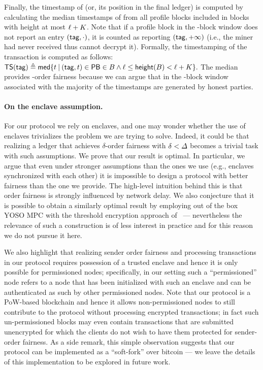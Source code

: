 Finally, the timestamp of \tx (or, its position in the final ledger) is computed by calculating the median timestamps of \txTag from all profile blocks included in blocks with height at most $\ell + K$.
%
Note that if a profile block in the \PBWindowLen-block window does not report an entry $(\mathsf{tag}, \cdot)$, it is counted as reporting $(\mathsf{tag}, +\infty)$ (i.e., the miner had never received \tx thus cannot decrypt it).
%
Formally, the timestamping of the transaction is computed as follows:
%
\( \mathsf{TS}(\mathsf{tag}) \triangleq \mathsf{med} \{ t \mathbin|  (\mathsf{tag}, t) \in \mathsf{PB} \in B \wedge \ell \le \mathsf{height}(B) < \ell + K\}. \)
%
The median provides \delay-order fairness because we can argue that in the \PBWindowLen-block window associated with \txTag the majority of the timestamps are generated by honest parties.

\paragraph{On the enclave assumption.}
%
For our protocol we rely on enclaves, and one may wonder whether the use of enclaves trivializes the problem we are trying to solve.
%
Indeed, it could be that realizing a ledger that achieves $\delta$-order fairness with $\delta < \varDelta$ becomes a trivial task with such assumptions.
%
We prove that our result is optimal.
%
In particular, we argue that even under stronger assumptions than the ones we use (e.g., enclaves synchronized with each other) it is impossible to design a protocol with better fairness than the one we provide.
%
The high-level intuition behind this is that order fairness is strongly influenced by network delay.
%
We also conjecture that it is possible to obtain a similarly optimal result by employing out of the box YOSO MPC \cite{TCC:BGGHKL20} with the threshold encryption approach of~\cite{TOKENOMICS:MalSza23} --- nevertheless the relevance of such a construction is of less interest in practice and for this reason we do not pursue it here.

We also highlight that realizing sender order fairness and processing transactions in our protocol requires possession of a trusted enclave and hence it is only possible for permissioned nodes; specifically, in our setting such a ``permissioned'' node refers to a node that has been initialized with such an enclave and can be authenticated as such by other permissioned nodes.
%
Note that our protocol is a PoW-based blockchain and hence it allows non-permissioned nodes to still contribute to the protocol without processing encrypted transactions; in fact such un-permissioned blocks may even contain transactions that are submitted unencrypted for which the clients do not wish to have them protected for sender-order fairness.
%
As a side remark, this simple observation suggests that our protocol can be implemented as a ``soft-fork'' over bitcoin --- we leave the details of this implementation to be explored in future work.

